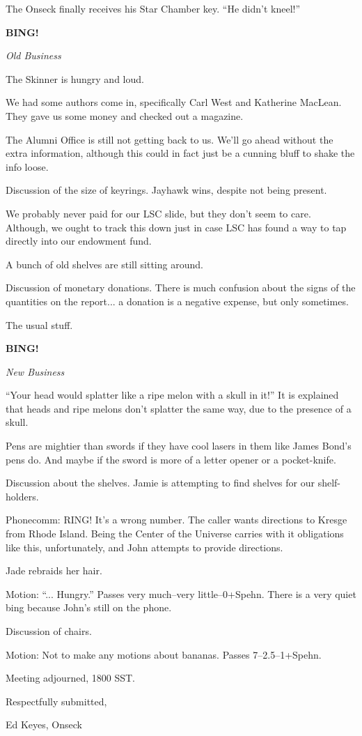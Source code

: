 \documentclass[12pt]{article}
\newcommand{\bing}{{\bf BING!} }
\newcommand{\goto}[1]{\bing \vskip 12pt \centerline{{\em{#1}}}}
\begin{document}
The Onseck finally receives his Star Chamber key.  ``He didn't kneel!''

\goto{Old Business}

The Skinner is hungry and loud.

We had some authors come in, specifically Carl West and Katherine
MacLean.  They gave us some money and checked out a magazine.

The Alumni Office is still not getting back to us.  We'll go ahead
without the extra information, although this could in fact just be
a cunning bluff to shake the info loose.

Discussion of the size of keyrings.  Jayhawk wins, despite not
being present.

We probably never paid for our LSC slide, but they don't seem to
care.  Although, we ought to track this down just in case LSC has
found a way to tap directly into our endowment fund.

A bunch of old shelves are still sitting around.

Discussion of monetary donations.  There is much confusion about
the signs of the quantities on the report... a donation is a
negative expense, but only sometimes.

The usual stuff.

\goto{New Business}

``Your head would splatter like a ripe melon with a skull in it!''
It is explained that heads and ripe melons don't splatter the same
way, due to the presence of a skull.

Pens are mightier than swords if they have cool lasers in them like
James Bond's pens do.  And maybe if the sword is more of a letter
opener or a pocket-knife.

Discussion about the shelves.  Jamie is attempting to find shelves
for our shelf-holders.

Phonecomm: RING!  It's a wrong number.  The caller wants directions
to Kresge from Rhode Island.  Being the Center of the Universe
carries with it obligations like this, unfortunately, and John
attempts to provide directions.

Jade rebraids her hair.

Motion: ``... Hungry.''  Passes very much--very little--0+Spehn.
There is a very quiet bing because John's still on the phone.

Discussion of chairs.

Motion: Not to make any motions about bananas.  Passes 7--2.5--1+Spehn.

\vspace{12pt}

\noindent
Meeting adjourned, 1800 SST.

\vspace{18pt}

\centerline{Respectfully submitted,}
\centerline{Ed Keyes, Onseck}
\end{document}
